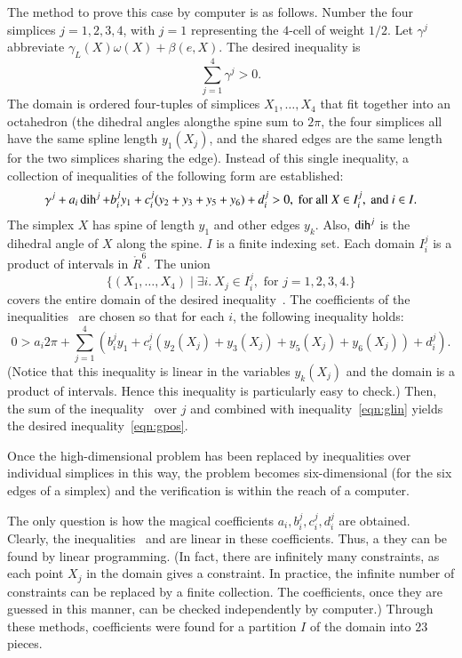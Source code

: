 The method to prove this case by computer is as follows.  Number the four simplices $j=1,2,3,4$, with $j=1$ representing the $4$-cell of weight $1/2$.  Let $\gamma^j$ abbreviate $\gamma_L(X)\omega(X) + \beta(e,X)$.   The desired inequality is
\begin{equation}\label{eqn:gpos}
\sum_{j=1}^4 \gamma^j > 0.
\end{equation}
The domain is ordered four-tuples of simplices $X_1,\ldots,X_4$ that fit together into an octahedron (the dihedral angles alongthe spine sum to $2\pi$, the four simplices all have the same spline length $y_1(X_j)$, and the shared edges are the same length for the two simplices sharing the edge).
Instead of this single inequality,  a collection of inequalities of the following form are established:
\begin{equation}\label{eqn:gpart}
\gamma^j + a_i \operatorname{dih}^j + b_i^j y_1 + c_i^j (y_2+y_3+y_5+y_6) + d_i^j > 0, \text{ for all } X \in I_i^j, \text{ and } i \in I. 
\end{equation}
The simplex $X$ has spine of length $y_1$ and other edges $y_k$.  Also, $\operatorname{dih}^j$ is the dihedral angle of $X$ along the spine.
$I$ is a finite indexing set.  Each domain $I_i^j$ is a product of intervals in $\ring{R}^6$.  The union 
$$
\{(X_1,\ldots,X_4)\mid \exists i.~ X_j \in I_i^j,\text{ for } j=1,2,3,4.\}
$$
covers the entire domain of the desired inequality~.  The coefficients of the inequalities~
are chosen so that for each $i$, the following inequality holds:
\begin{equation}\label{eqn:glin}
0 > a_i 2\pi + \sum_{j=1}^4 (b_i^j y_1 +  c_i^j (y_2(X_j)+y_3(X_j)+y_5(X_j)+y_6(X_j)) + d_i^j).
\end{equation}
(Notice that this inequality is linear in the variables $y_k(X_j)$ and the domain is a product of intervals.  Hence this inequality is particularly easy to check.)
Then, the sum of the inequality~ over $j$ and combined with inequality~\ref{eqn:glin} yields the desired inequality~\ref{eqn:gpos}.

Once the high-dimensional problem has been replaced by inequalities over individual simplices in this way, the problem becomes six-dimensional (for the six edges of a simplex) and the verification is within the reach of  a computer.

The only question is how the magical coefficients $a_i,b_i^j,c_i^j,d_i^j$ are obtained.  Clearly, the inequalities~ and  are linear in these coefficients.  Thus, a they can be found by linear programming.  (In fact, there are infinitely many constraints, as each point $X_j$ in the domain gives a constraint.  In practice, the infinite number of constraints can be replaced by a finite collection.  The coefficients, once they are guessed in this manner, can be checked independently by computer.)  Through these methods, coefficients were found for a partition $I$ of the domain into $23$ pieces.

